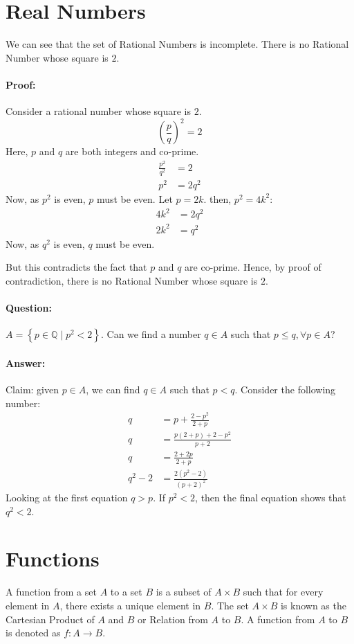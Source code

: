 \documentclass[12pt, oneside]{book}
\begin{document}
\section{Real Numbers}
We can see that the set of Rational Numbers is incomplete.
There is no Rational Number whose square is \(2\).
\paragraph{Proof:} Consider a rational number whose square is \(2\).
\[ \left(\frac{p}{q}\right)^2 = 2 \]
Here, \(p\) and \(q\) are both integers and co-prime.
\begin{align*}
	\frac{p^2}{q^2} & = 2    \\
	p^2             & = 2q^2
\end{align*}
Now, as \(p^2\) is even, \(p\) must be even.
Let \(p = 2k\). then, \(p^2 = 4k^2\):
\begin{align*}
	4k^2 & = 2q^2 \\
	2k^2 & = q^2
\end{align*}
Now, as \(q^2\) is even, \(q\) must be even.

But this contradicts the fact that \(p\) and \(q\) are co-prime.
Hence, by proof of contradiction, there is no Rational Number whose square is \(2\).

\paragraph{Question:} \(A = \left\{ p \in \mathbb{Q} \; | \; p^2 < 2 \right\}\).
Can we find a number \(q \in A\) such that \( p \leq q, \forall p \in A \)?
\paragraph{Answer:} Claim: given \(p \in A\), we can find \(q \in A\) such that \(p < q\).
Consider the following number:
\begin{align*}
	q       & = p + \frac{2-p^2}{2+p}                              \\
	q       & = \frac{p\left(2+p\right) + 2 - p^2}{p +2}           \\
	q       & = \frac{2 + 2p}{2 + p}                               \\
	q^2 - 2 & = \frac{2\left(p^2 - 2\right)}{\left(p + 2\right)^2}
\end{align*}
Looking at the first equation \(q > p\). If \(p^2 < 2\), then the final equation shows that \(q^2 < 2\).

\section{Functions}
A function from a set \(A\) to a set \(B\) is a subset of \(A \times B\) such that for every element in \(A\), there exists a unique element in \(B\).
The set \(A \times B \) is known as the Cartesian Product of \(A\) and \(B\) or Relation from \(A\) to \(B\).
A function from \(A\) to \(B\) is denoted as \(f: A \to B\).
\end{document}

